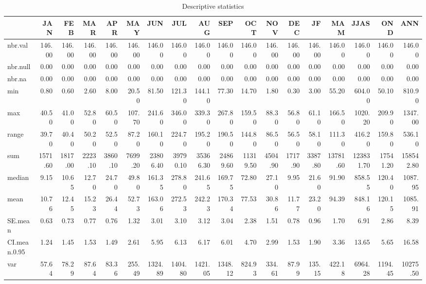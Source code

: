 \documentclass[12pt,openany]{book}
\begin{document}
\begin{longtable}{lrrrrrrrrrrrrrrrrr}
\caption{\label{tab:unnamed-chunk-5}Descriptive statistics}\\
\toprule
  & JAN & FEB & MAR & APR & MAY & JUN & JUL & AUG & SEP & OCT & NOV & DEC & JF & MAM & JJAS & OND & ANN\\
\midrule
\rowcolor{gray!6}  nbr.val & 146.00 & 146.00 & 146.00 & 146.00 & 146.00 & 146.00 & 146.00 & 146.00 & 146.00 & 146.00 & 146.00 & 146.00 & 146.00 & 146.00 & 146.00 & 146.00 & 146.00\\
nbr.null & 0.00 & 0.00 & 0.00 & 0.00 & 0.00 & 0.00 & 0.00 & 0.00 & 0.00 & 0.00 & 0.00 & 0.00 & 0.00 & 0.00 & 0.00 & 0.00 & 0.00\\
\rowcolor{gray!6}  nbr.na & 0.00 & 0.00 & 0.00 & 0.00 & 0.00 & 0.00 & 0.00 & 0.00 & 0.00 & 0.00 & 0.00 & 0.00 & 0.00 & 0.00 & 0.00 & 0.00 & 0.00\\
min & 0.80 & 0.60 & 2.60 & 8.00 & 20.50 & 81.50 & 121.30 & 144.10 & 77.30 & 14.70 & 1.80 & 0.30 & 3.00 & 55.20 & 604.00 & 50.10 & 810.90\\
\rowcolor{gray!6}  max & 40.50 & 41.00 & 52.80 & 60.50 & 107.70 & 241.60 & 346.00 & 339.30 & 267.80 & 159.50 & 88.30 & 56.80 & 61.10 & 166.50 & 1020.20 & 209.90 & 1347.00\\
\addlinespace
range & 39.70 & 40.40 & 50.20 & 52.50 & 87.20 & 160.10 & 224.70 & 195.20 & 190.50 & 144.80 & 86.50 & 56.50 & 58.10 & 111.30 & 416.20 & 159.80 & 536.10\\
\rowcolor{gray!6}  sum & 1571.60 & 1817.00 & 2223.10 & 3860.10 & 7699.20 & 23806.40 & 39790.10 & 35366.30 & 24869.60 & 11319.50 & 4504.90 & 1717.90 & 3387.80 & 13781.60 & 123831.70 & 17541.20 & 158542.80\\
median & 9.15 & 10.65 & 12.70 & 24.70 & 49.80 & 161.35 & 278.80 & 241.65 & 169.75 & 72.80 & 27.10 & 9.95 & 21.60 & 91.90 & 858.55 & 120.40 & 1087.95\\
\rowcolor{gray!6}  mean & 10.76 & 12.45 & 15.23 & 26.44 & 52.73 & 163.06 & 272.53 & 242.23 & 170.34 & 77.53 & 30.86 & 11.77 & 23.20 & 94.39 & 848.16 & 120.15 & 1085.91\\
SE.mean & 0.63 & 0.73 & 0.77 & 0.76 & 1.32 & 3.01 & 3.10 & 3.12 & 3.04 & 2.38 & 1.51 & 0.78 & 0.96 & 1.70 & 6.91 & 2.86 & 8.39\\
\addlinespace
\rowcolor{gray!6}  CI.mean.0.95 & 1.24 & 1.45 & 1.53 & 1.49 & 2.61 & 5.95 & 6.13 & 6.17 & 6.01 & 4.70 & 2.99 & 1.53 & 1.90 & 3.36 & 13.65 & 5.65 & 16.58\\
var & 57.64 & 78.29 & 87.64 & 83.36 & 255.49 & 1324.89 & 1404.80 & 1421.05 & 1348.12 & 824.93 & 334.61 & 87.99 & 135.15 & 422.18 & 6964.28 & 1194.45 & 10275.50\\

\end{longtable}
\end{document}
